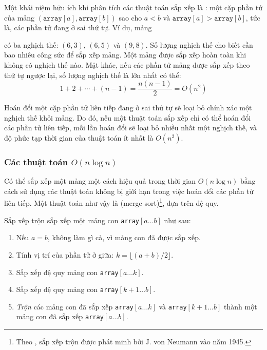 Một khái niệm hữu ích khi phân tích các thuật toán
sắp xếp là :
một cặp phần tử của mảng
$(\texttt{array}[a],\texttt{array}[b])$ sao cho
$a<b$ và $\texttt{array}[a]>\texttt{array}[b]$,
tức là, các phần tử đang ở sai thứ tự.
Ví dụ, mảng
\begin{center}
\end{center}
có ba nghịch thế: $(6,3)$, $(6,5)$ và $(9,8)$.
Số lượng nghịch thế cho biết
cần bao nhiêu công sức để sắp xếp mảng.
Một mảng được sắp xếp hoàn toàn khi
không có nghịch thế nào.
Mặt khác, nếu các phần tử mảng
được sắp xếp theo thứ tự ngược lại,
số lượng nghịch thế là lớn nhất có thể:
\[1+2+\cdots+(n-1)=\frac{n(n-1)}{2} = O(n^2)\]

Hoán đổi một cặp phần tử liên tiếp đang
ở sai thứ tự sẽ loại bỏ chính xác một nghịch thế
khỏi mảng.
Do đó, nếu một thuật toán sắp xếp chỉ có thể
hoán đổi các phần tử liên tiếp, mỗi lần hoán đổi sẽ loại bỏ
nhiều nhất một nghịch thế, và độ phức tạp thời gian
của thuật toán ít nhất là $O(n^2)$.

\subsubsection{Các thuật toán $O(n \log n)$}


Có thể sắp xếp một mảng một cách hiệu quả
trong thời gian $O(n \log n)$ bằng cách sử dụng các thuật toán
không bị giới hạn trong việc hoán đổi các phần tử liên tiếp.
Một thuật toán như vậy là  (merge sort)\footnote{Theo \cite{knu983},
sắp xếp trộn được phát minh bởi J. von Neumann vào năm 1945.},
dựa trên đệ quy.

Sắp xếp trộn sắp xếp một mảng con \texttt{array}$[a \ldots b]$ như sau:

\begin{enumerate}
\item Nếu $a=b$, không làm gì cả, vì mảng con đã được sắp xếp.
\item Tính vị trí của phần tử ở giữa: $k=\lfloor (a+b)/2 \rfloor$.
\item Sắp xếp đệ quy mảng con \texttt{array}$[a \ldots k]$.
\item Sắp xếp đệ quy mảng con \texttt{array}$[k+1 \ldots b]$.
\item \emph{Trộn} các mảng con đã sắp xếp \texttt{array}$[a \ldots k]$ và
\texttt{array}$[k+1 \ldots b]$
thành một mảng con đã sắp xếp \texttt{array}$[a \ldots b]$.
\end{enumerate}

